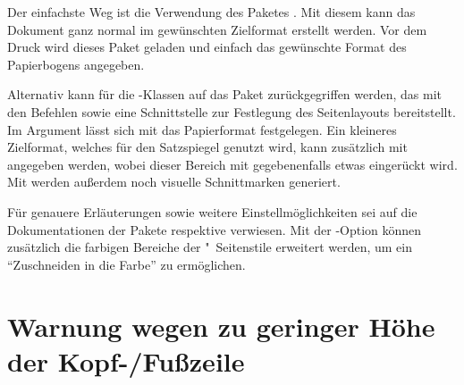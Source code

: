 Der einfachste Weg ist die Verwendung des Paketes . Mit diesem 
kann das Dokument ganz normal im gewünschten Zielformat erstellt werden. Vor 
dem Druck wird dieses Paket geladen und einfach das gewünschte Format des 
Papierbogens angegeben. 
%
\begin{quoting}[rightmargin=0pt]
\end{quoting}
%
Alternativ kann für die \TUDScript-Klassen auf das Paket 
zurückgegriffen werden, das mit den Befehlen  sowie 
 eine Schnittstelle zur Festlegung des Seitenlayouts 
bereitstellt. Im Argument lässt sich mit 
das Papierformat festgelegen. Ein kleineres Zielformat, welches für den 
Satzspiegel genutzt wird, kann zusätzlich mit  
angegeben werden, wobei dieser Bereich mit  
gegebenenfalls etwas eingerückt wird. Mit  werden 
außerdem noch visuelle Schnittmarken generiert.
%
\begin{quoting}[rightmargin=0pt]
\end{quoting}
%
Für genauere Erläuterungen sowie weitere Einstellmöglichkeiten sei auf die 
Dokumentationen der Pakete  respektive  
verwiesen. Mit der \TUDScript-Option  können zusätzlich die 
farbigen Bereiche der "~Seitenstile erweitert werden, um 
ein \enquote{Zuschneiden in die Farbe} zu ermöglichen.



\section{%
  Warnung wegen zu geringer Höhe der Kopf-/Fußzeile%
  \label{sec:tips:headline}%
}

